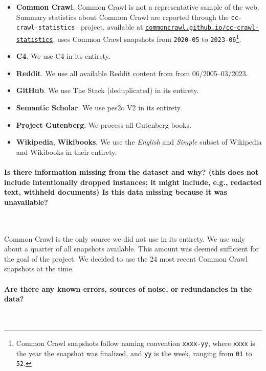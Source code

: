\begin{itemize}[leftmargin=1em]
    \item \textbf{Common Crawl}. Common Crawl is not a representative sample of the web. Summary statistics about Common Crawl are reported through the \texttt{cc-crawl-statistics}~\citep{cc-crawl-statistics} project, available at \href{https://commoncrawl.github.io/cc-crawl-statistics/}{\texttt{commoncrawl.github.io/cc-crawl-statistics}}. \dolma uses  Common Crawl snapshots from \texttt{2020-05} to \texttt{2023-06}\footnote{Common Crawl snapshots follow naming convention \texttt{xxxx-yy}, where \texttt{xxxx} is the year the snapshot was finalized, and \texttt{yy} is the week, ranging from \texttt{01} to \texttt{52}.}.
    \item \textbf{C4}. We use C4 in its entirety. 
    \item \textbf{Reddit}. We use all available Reddit content from from 06/2005--03/2023.
    \item \textbf{GitHub}. We use The Stack (deduplicated) in its entirety. 
    \item \textbf{Semantic Scholar}. We use pes2o V2 in its entirety. 
    \item \textbf{Project Gutenberg}. We process all Gutenberg books. 
    \item \textbf{Wikipedia}, \textbf{Wikibooks}. We use the \textit{English} and \textit{Simple} subset of Wikipedia and Wikibooks in their entirety.  
\end{itemize}

\paragraph{Is there information missing from the dataset and why? (this does not include intentionally dropped instances; it might include, e.g., redacted text, withheld documents) Is this data missing because it was unavailable?}~

Common Crawl is the only source we did not use in its entirety. 
We use only about a quarter of all snapshots available. 
This amount was deemed sufficient for the goal of the \dolma project.
We decided to use the 24 most recent Common Crawl snapshots at the time.

\paragraph{Are there any known errors, sources of noise, or redundancies in the data?}~

